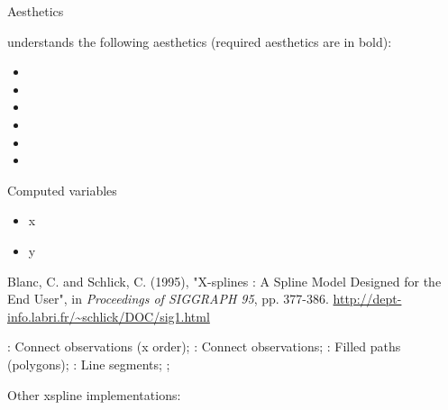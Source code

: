 \documentclass[a4paper]{book}
\begin{document}
%
\begin{Section}{Aesthetics}

 understands the following aesthetics (required aesthetics
are in bold):
\begin{itemize}

\item{} 
\item{} 
\item{} 
\item{} 
\item{} 
\item{} 

\end{itemize}

\end{Section}
%
\begin{Section}{Computed variables}

\begin{itemize}

\item{} x
\item{} y

\end{itemize}

\end{Section}
%
\begin{References}
Blanc, C. and Schlick, C. (1995), "X-splines : A Spline Model
Designed for the End User", in \emph{Proceedings of SIGGRAPH 95},
pp. 377-386. \url{http://dept-info.labri.fr/~schlick/DOC/sig1.html}
\end{References}
%
\begin{SeeAlso}
: Connect observations (x order);
: Connect observations;
: Filled paths (polygons);
: Line segments;
;

Other xspline implementations: 
\end{SeeAlso}
%
\end{document}
